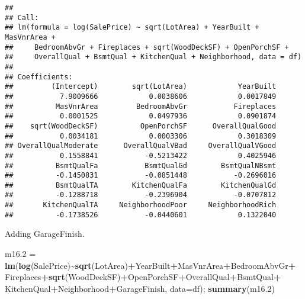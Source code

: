 \documentclass[
]{article}
\newenvironment{Shaded}{\begin{snugshade}}{\end{snugshade}}
\newcommand{\AttributeTok}[1]{\textcolor[rgb]{0.13,0.29,0.53}{#1}}
\newcommand{\FloatTok}[1]{\textcolor[rgb]{0.00,0.00,0.81}{#1}}
\newcommand{\FunctionTok}[1]{\textcolor[rgb]{0.13,0.29,0.53}{\textbf{#1}}}
\newcommand{\NormalTok}[1]{#1}
\newcommand{\OtherTok}[1]{\textcolor[rgb]{0.56,0.35,0.01}{#1}}
\newcommand{\SpecialCharTok}[1]{\textcolor[rgb]{0.81,0.36,0.00}{\textbf{#1}}}
\begin{document}
\begin{verbatim}
## 
## Call:
## lm(formula = log(SalePrice) ~ sqrt(LotArea) + YearBuilt + MasVnrArea + 
##     BedroomAbvGr + Fireplaces + sqrt(WoodDeckSF) + OpenPorchSF + 
##     OverallQual + BsmtQual + KitchenQual + Neighborhood, data = df)
## 
## Coefficients:
##         (Intercept)        sqrt(LotArea)            YearBuilt  
##           7.9009666            0.0038606            0.0017849  
##          MasVnrArea         BedroomAbvGr           Fireplaces  
##           0.0001525            0.0497936            0.0901874  
##    sqrt(WoodDeckSF)          OpenPorchSF      OverallQualGood  
##           0.0034181            0.0003306            0.3018309  
## OverallQualModerate      OverallQualVBad     OverallQualVGood  
##           0.1558841           -0.5213422            0.4025946  
##          BsmtQualFa           BsmtQualGd        BsmtQualNBsmt  
##          -0.1450831           -0.0851448           -0.2696016  
##          BsmtQualTA        KitchenQualFa        KitchenQualGd  
##          -0.1288718           -0.2396904           -0.0707812  
##       KitchenQualTA     NeighborhoodPoor     NeighborhoodRich  
##          -0.1738526           -0.0440601            0.1322040
\end{verbatim}

Adding GarageFinish.

\begin{Shaded}
\begin{Highlighting}[]
\NormalTok{m16}\FloatTok{.2} \OtherTok{=} \FunctionTok{lm}\NormalTok{(}\FunctionTok{log}\NormalTok{(SalePrice)}\SpecialCharTok{\textasciitilde{}}\FunctionTok{sqrt}\NormalTok{(LotArea)}\SpecialCharTok{+}\NormalTok{YearBuilt}\SpecialCharTok{+}\NormalTok{MasVnrArea}\SpecialCharTok{+}\NormalTok{BedroomAbvGr}\SpecialCharTok{+}
\NormalTok{             Fireplaces}\SpecialCharTok{+}\FunctionTok{sqrt}\NormalTok{(WoodDeckSF)}\SpecialCharTok{+}\NormalTok{OpenPorchSF}\SpecialCharTok{+}\NormalTok{OverallQual}\SpecialCharTok{+}\NormalTok{BsmtQual}\SpecialCharTok{+}
\NormalTok{             KitchenQual}\SpecialCharTok{+}\NormalTok{Neighborhood}\SpecialCharTok{+}\NormalTok{GarageFinish, }\AttributeTok{data=}\NormalTok{df); }\FunctionTok{summary}\NormalTok{(m16}\FloatTok{.2}\NormalTok{)}
\end{Highlighting}
\end{Shaded}
\end{document}
